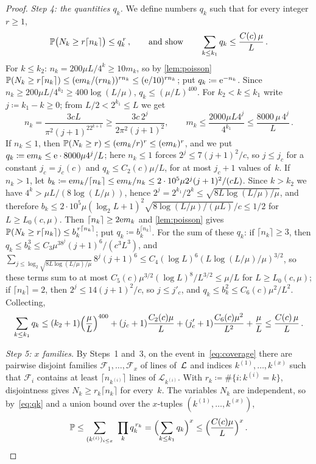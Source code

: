 \documentclass[11pt,letterpaper]{article}
\begin{document}
\begin{proof}
\emph{Step 4: the quantities $q_k$.} We define numbers $q_k$ such that for every integer $r\ge1$,
\begin{equation}
\label{eq:qk}
  \P\bigl(N_k\ge r\lceil n_k\rceil\bigr)\le q_k^{\,r}\,,\qquad\text{and show}\qquad\sum_{k\le k_1}q_k\le\frac{C(c)\,\mu}{L}\,.
\end{equation}
For $k\le k_2$: $n_k=200\mu L/4^k\ge10m_k$, so by \cref{lem:poisson} $\P(N_k\ge r\lceil n_k\rceil)\le(\e m_k/(rn_k))^{rn_k}\le(\e/10)^{rn_k}$; put $q_k\coloneqq\e^{-n_k}$. Since $n_k\ge200\mu L/4^{k_2}\ge400\log(L/\mu)$, $q_k\le(\mu/L)^{400}$. For $k_2<k\le k_1$ write $j\coloneqq k_1-k\ge0$; from $L/2<2^{k_1}\le L$ we get
\begin{equation*}
  n_k=\frac{3cL}{\pi^2(j+1)^22^{k+1}}\ge\frac{3c\,2^j}{2\pi^2(j+1)^2},\qquad m_k\le\frac{2000\mu L4^j}{4^{k_1}}\le\frac{8000\,\mu\,4^j}{L}\,.
\end{equation*}
If $n_k\le1$, then $\P(N_k\ge r)\le(\e m_k/r)^r\le(\e m_k)^r$, and we put $q_k\coloneqq\e m_k\le\e\cdot8000\mu4^j/L$; here $n_k\le1$ forces $2^j\le7(j+1)^2/c$, so $j\le j_c$ for a constant $j_c=j_c(c)$ and $q_k\le C_2(c)\mu/L$, for at most $j_c+1$ values of~$k$. If $n_k>1$, let $b_k\coloneqq\e m_k/\lceil n_k\rceil\le\e m_k/n_k\le2\cdot10^5\mu2^j(j+1)^2/(cL)$. Since $k>k_2$ we have $4^k>\mu L/(8\log(L/\mu))$, hence $2^j=2^{k_1}/2^k\le\sqrt{8L\log(L/\mu)/\mu}$, and therefore $b_k\le2\cdot10^5\mu(\log_2L+1)^2\sqrt{8\log(L/\mu)/(\mu L)}/c\le1/2$ for $L\ge L_0(c,\mu)$. Then $\lceil n_k\rceil\ge2\e m_k$ and \cref{lem:poisson} gives $\P(N_k\ge r\lceil n_k\rceil)\le b_k^{\,r\lceil n_k\rceil}$; put $q_k\coloneqq b_k^{\lceil n_k\rceil}$. For the sum of these $q_k$: if $\lceil n_k\rceil\ge3$, then $q_k\le b_k^3\le C_3\mu^38^j(j+1)^6/(c^3L^3)$, and $\sum_{j\le\log_2\sqrt{8L\log(L/\mu)/\mu}}8^j(j+1)^6\le C_4(\log L)^6(L\log(L/\mu)/\mu)^{3/2}$, so these terms sum to at most $C_5(c)\mu^{3/2}(\log L)^{8}/L^{3/2}\le\mu/L$ for $L\ge L_0(c,\mu)$; if $\lceil n_k\rceil=2$, then $2^j\le14(j+1)^2/c$, so $j\le j'_c$, and $q_k\le b_k^2\le C_6(c)\mu^2/L^2$. Collecting,
\begin{equation*}
  \sum_{k\le k_1}q_k\le(k_2+1)\Bigl(\frac\mu L\Bigr)^{400}+(j_c+1)\frac{C_2(c)\mu}{L}+(j'_c+1)\frac{C_6(c)\mu^2}{L^2}+\frac{\mu}{L}\le\frac{C(c)\,\mu}{L}\,.
\end{equation*}

\emph{Step 5: $x$ families.} By Steps~1 and~3, on the event in~\eqref{eq:coverage} there are pairwise disjoint families $\mathcal F_1,\dots,\mathcal F_x$ of lines of~$\cL$ and indices $k^{(1)},\dots,k^{(x)}$ such that $\mathcal F_i$ contains at least $\lceil n_{k^{(i)}}\rceil$ lines of $\mathcal L_{k^{(i)}}$. With $r_k\coloneqq\#\{i\colon k^{(i)}=k\}$, disjointness gives $N_k\ge r_k\lceil n_k\rceil$ for every~$k$. The variables $N_k$ are independent, so by~\eqref{eq:qk} and a union bound over the $x$-tuples $(k^{(1)},\dots,k^{(x)})$,
\begin{equation*}
  \P\le\sum_{(k^{(i)})_{i\le x}}\ \prod_{k}q_k^{\,r_k}=\Bigl(\sum_{k\le k_1}q_k\Bigr)^{x}\le\Bigl(\frac{C(c)\mu}{L}\Bigr)^x\,.\qedhere
\end{equation*}
\end{proof}
\end{document}
